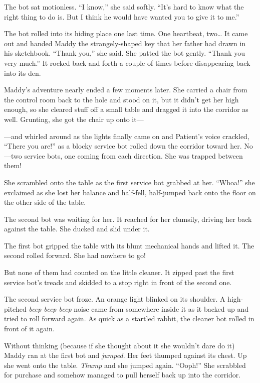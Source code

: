 \documentclass[10pt]{article}
\begin{document}
The bot sat motionless. ``I know,'' she said softly. ``It's hard to know
what the right thing to do is. But I think he would have wanted you to
give it to me.''

The bot rolled into its hiding place one last time. One heartbeat,
two\ldots{} It came out and handed Maddy the strangely-shaped key that
her father had drawn in his sketchbook. ``Thank you,'' she said. She
patted the bot gently. ``Thank you very much.'' It rocked back and forth
a couple of times before disappearing back into its den.

Maddy's adventure nearly ended a few moments later. She carried a chair
from the control room back to the hole and stood on it, but it didn't
get her high enough, so she cleared stuff off a small table and dragged
it into the corridor as well. Grunting, she got the chair up onto it---

---and whirled around as the lights finally came on and Patient's voice
crackled, ``There you are!'' as a blocky service bot rolled down the
corridor toward her. No---two service bots, one coming from each
direction. She was trapped between them!

She scrambled onto the table as the first service bot grabbed at her.
``Whoa!'' she exclaimed as she lost her balance and half-fell,
half-jumped back onto the floor on the other side of the table.

The second bot was waiting for her. It reached for her clumsily, driving
her back against the table. She ducked and slid under it.

The first bot gripped the table with its blunt mechanical hands and
lifted it. The second rolled forward. She had nowhere to go!

But none of them had counted on the little cleaner. It zipped past the
first service bot's treads and skidded to a stop right in front of the
second one.

The second service bot froze. An orange light blinked on its shoulder. A
high-pitched \emph{beep beep beep} noise came from somewhere inside it
as it backed up and tried to roll forward again. As quick as a startled
rabbit, the cleaner bot rolled in front of it again.

Without thinking (because if she thought about it she wouldn't dare do
it) Maddy ran at the first bot and \emph{jumped}. Her feet thumped
against its chest. Up she went onto the table. \emph{Thump} and she
jumped again. ``Ooph!'' She scrabbled for purchase and somehow managed
to pull herself back up into the corridor.
\end{document}

